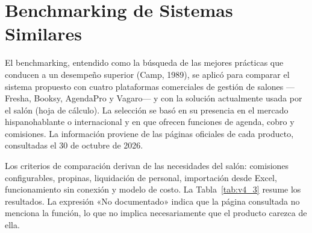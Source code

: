 \section{Benchmarking de Sistemas Similares}\label{cap:benchmarking}

El benchmarking, entendido como la búsqueda de las mejores prácticas que conducen a un desempeño superior (Camp, 1989), se aplicó para comparar el sistema propuesto con cuatro plataformas comerciales de gestión de salones —Fresha, Booksy, AgendaPro y Vagaro— y con la solución actualmente usada por el salón (hoja de cálculo). La selección se basó en su presencia en el mercado hispanohablante o internacional y en que ofrecen funciones de agenda, cobro y comisiones. La información proviene de las páginas oficiales de cada producto, consultadas el 30 de octubre de 2026.


Los criterios de comparación derivan de las necesidades del salón: comisiones configurables, propinas, liquidación de personal, importación desde Excel, funcionamiento sin conexión y modelo de costo. La Tabla~\ref{tab:v4_3} resume los resultados. La expresión «No documentado» indica que la página consultada no menciona la función, lo que no implica necesariamente que el producto carezca de ella.



